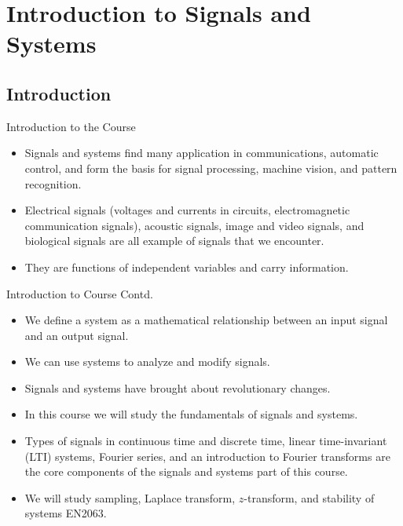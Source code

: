 \section{Introduction to Signals and Systems}

\subsection{Introduction}

\begin{frame}{Introduction to the Course}
    \begin{itemize}[<+->]
        \item Signals and systems find many application in communications, automatic control, and form the basis for signal processing, machine vision, and pattern recognition.
        \item Electrical signals (voltages and currents in circuits, electromagnetic communication signals), acoustic signals, image and video signals, and biological signals are all example of signals that we encounter.
        \item They are functions of independent variables and carry information.
    \end{itemize}
\end{frame}

\begin{frame}{Introduction to Course Contd.}
    \begin{itemize}[<+->]
        \item We define a system as a mathematical relationship between an input signal and an output signal.
        \item We can use systems to analyze and modify signals.
        \item Signals and systems have brought about revolutionary changes.
        \item In this course we will study the fundamentals of signals and systems.
        \item Types of signals in continuous time and discrete time, linear time-invariant (LTI) systems, Fourier series, and an introduction to Fourier transforms are the core components of the signals and systems part of this course.
        \item We will study sampling, Laplace transform, $z$-transform, and stability of systems EN2063.
    \end{itemize}
\end{frame}




